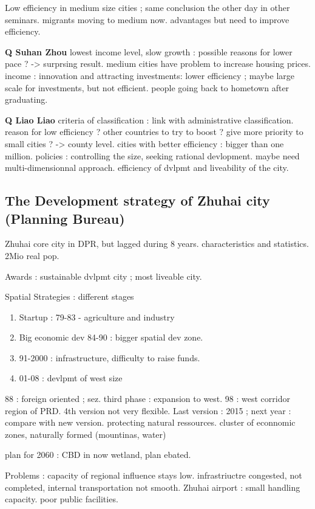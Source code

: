Low efficiency in medium size cities ; same conclusion the other day in other seminars. migrants moving to medium now. advantages but need to improve efficiency.

\textbf{Q Suhan Zhou}  lowest income level, slow growth : possible reasons for lower pace ? -> surprsing result. medium cities have problem to increase housing prices. income : innovation and attracting investments: lower efficiency ; maybe large scale for investments, but not efficient. people going back to hometown after graduating.

\textbf{Q Liao Liao} criteria of classification : link with administrative classification. reason for low efficiency ? other countries to try to boost ? give more priority to small cities ? -> county level. cities with better efficiency : bigger than one million. policies : controlling the size, seeking rational devlopment. maybe need multi-dimensionnal approach. efficiency of dvlpmt and liveability of the city.




\subsection*{The Development strategy of Zhuhai city (Planning Bureau)}

Zhuhai core city in DPR, but lagged during 8 years.
characteristics and statistics. 2Mio real pop.

Awards : sustainable dvlpmt city ; most liveable city.

Spatial Strategies : different stages
\begin{enumerate}
\item Startup : 79-83 - agriculture and industry
\item Big economic dev 84-90 : bigger spatial dev zone.
\item 91-2000 : infrastructure, difficulty to raise funds.
\item 01-08 : devlpmt of west size
\end{enumerate}

88 : foreign oriented ; sez.
third phase : expansion to west.
98 : west corridor region of PRD. 4th version not very flexible.
Last version : 2015 ; next year : compare with new version. protecting natural ressources. cluster of econnomic zones, naturally formed (mountinas, water)

plan for 2060 : CBD in now wetland, plan ebated.

Problems : capacity of regional influence stays low. infrastriuctre congested, not completed, internal transportation not smooth. Zhuhai airport : small handling capacity. poor public facilities.

